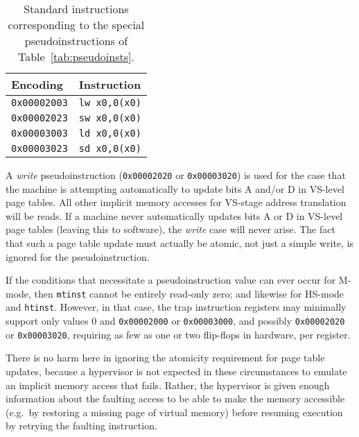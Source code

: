 \begin{table*}[h!]
\begin{center}
\begin{tabular}{|l|l|}
\hline
Encoding         & Instruction \\ \hline
{\tt 0x00002003} & {\tt lw x0,0(x0)} \\
{\tt 0x00002023} & {\tt sw x0,0(x0)} \\ \hline
{\tt 0x00003003} & {\tt ld x0,0(x0)} \\
{\tt 0x00003023} & {\tt sd x0,0(x0)} \\ \hline
\end{tabular}
\end{center}
\caption{Standard instructions corresponding to the special
pseudoinstructions of Table~\ref{tab:pseudoinsts}.}
\label{tab:pseudoinsts-basis}
\end{table*}

A \textit{write} pseudoinstruction ({\tt 0x00002020} or {\tt 0x00003020})
is used for the case that the machine is attempting automatically to
update bits A and/or D in VS-level page tables.
All other implicit memory accesses for VS-stage address translation will
be reads.
If a machine never automatically updates bits A or D in VS-level page
tables (leaving this to software), the \textit{write} case will never
arise.
The fact that such a page table update must actually be atomic, not just
a simple write, is ignored for the pseudoinstruction.

\begin{commentary}
If the conditions that necessitate a pseudoinstruction value can ever
occur for M-mode, then {\tt mtinst} cannot be entirely read-only zero;
and likewise for HS-mode and {\tt htinst}.
However, in that case, the trap instruction registers may minimally
support only values 0 and {\tt 0x00002000} or {\tt 0x00003000}, and
possibly {\tt 0x00002020} or {\tt 0x00003020}, requiring as few as one or
two flip-flops in hardware, per register.
\end{commentary}

\begin{commentary}
There is no harm here in ignoring the atomicity requirement for page
table updates, because a hypervisor is not expected in these
circumstances to emulate an implicit memory access that fails.
Rather, the hypervisor is given enough information about the faulting
access to be able to make the memory accessible (e.g.\ by restoring a
missing page of virtual memory) before resuming execution by retrying the
faulting instruction.
\end{commentary}

